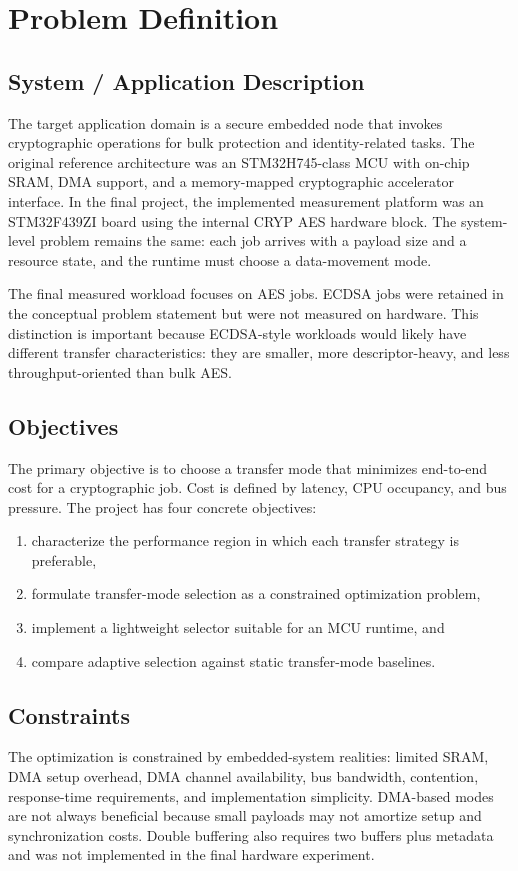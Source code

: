 \documentclass[conference]{IEEEtran}
\begin{document}
\section{Problem Definition}
\subsection{System / Application Description}
The target application domain is a secure embedded node that invokes cryptographic operations for bulk protection and identity-related tasks. The original reference architecture was an STM32H745-class MCU with on-chip SRAM, DMA support, and a memory-mapped cryptographic accelerator interface. In the final project, the implemented measurement platform was an STM32F439ZI board using the internal CRYP AES hardware block. The system-level problem remains the same: each job arrives with a payload size and a resource state, and the runtime must choose a data-movement mode.

The final measured workload focuses on AES jobs. ECDSA jobs were retained in the conceptual problem statement but were not measured on hardware. This distinction is important because ECDSA-style workloads would likely have different transfer characteristics: they are smaller, more descriptor-heavy, and less throughput-oriented than bulk AES.

\subsection{Objectives}
The primary objective is to choose a transfer mode that minimizes end-to-end cost for a cryptographic job. Cost is defined by latency, CPU occupancy, and bus pressure. The project has four concrete objectives:
\begin{enumerate}
    \item characterize the performance region in which each transfer strategy is preferable,
    \item formulate transfer-mode selection as a constrained optimization problem,
    \item implement a lightweight selector suitable for an MCU runtime, and
    \item compare adaptive selection against static transfer-mode baselines.
\end{enumerate}

\subsection{Constraints}
The optimization is constrained by embedded-system realities: limited SRAM, DMA setup overhead, DMA channel availability, bus bandwidth, contention, response-time requirements, and implementation simplicity. DMA-based modes are not always beneficial because small payloads may not amortize setup and synchronization costs. Double buffering also requires two buffers plus metadata and was not implemented in the final hardware experiment.
\end{document}
